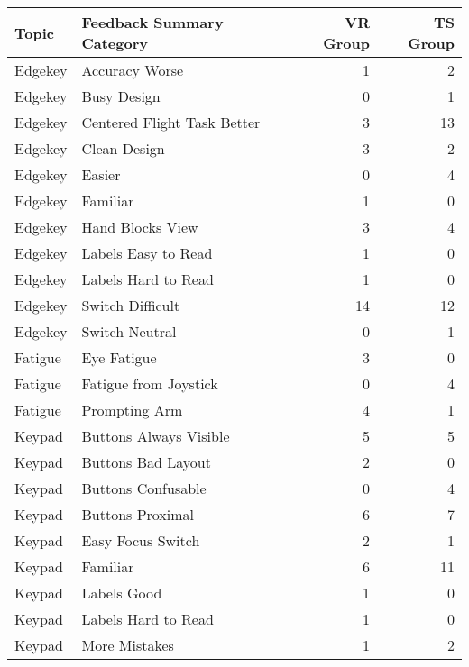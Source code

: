 \begin{tabular}{llrr}
\toprule
   Topic &    Feedback Summary Category &  VR Group &  TS Group \\
\midrule
 Edgekey &               Accuracy Worse &         1 &         2 \\
 Edgekey &                  Busy Design &         0 &         1 \\
 Edgekey &  Centered Flight Task Better &         3 &        13 \\
 Edgekey &                 Clean Design &         3 &         2 \\
 Edgekey &                       Easier &         0 &         4 \\
 Edgekey &                     Familiar &         1 &         0 \\
 Edgekey &             Hand Blocks View &         3 &         4 \\
 Edgekey &          Labels Easy to Read &         1 &         0 \\
 Edgekey &          Labels Hard to Read &         1 &         0 \\
 Edgekey &             Switch Difficult &        14 &        12 \\
 Edgekey &               Switch Neutral &         0 &         1 \\
 Fatigue &                  Eye Fatigue &         3 &         0 \\
 Fatigue &        Fatigue from Joystick &         0 &         4 \\
 Fatigue &                Prompting Arm &         4 &         1 \\
  Keypad &       Buttons Always Visible &         5 &         5 \\
  Keypad &           Buttons Bad Layout &         2 &         0 \\
  Keypad &           Buttons Confusable &         0 &         4 \\
  Keypad &             Buttons Proximal &         6 &         7 \\
  Keypad &            Easy Focus Switch &         2 &         1 \\
  Keypad &                     Familiar &         6 &        11 \\
  Keypad &                  Labels Good &         1 &         0 \\
  Keypad &          Labels Hard to Read &         1 &         0 \\
  Keypad &                More Mistakes &         1 &         2 \\

\end{tabular}
